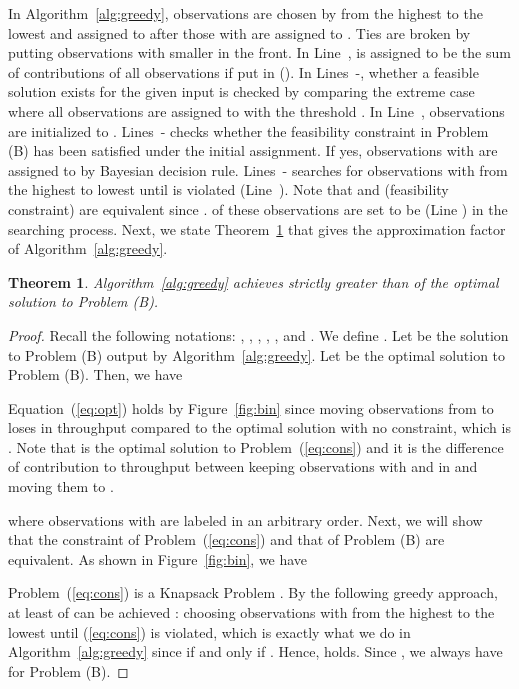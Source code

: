 \documentclass[conference]{IEEEtran}
\newtheorem{theorem}{Theorem}[section]
\begin{document}
In Algorithm~\ref{alg:greedy}, observations are chosen by  from the highest to the lowest and assigned to  after those with  are assigned to . Ties are broken by putting observations with smaller  in the front. In Line~,  is assigned to be the sum of contributions of all observations if put in  (). In Lines~-, whether a feasible solution exists for the given input is checked by comparing the extreme case where all observations are assigned to  with the threshold . In Line~, observations are initialized to . Lines~- checks whether the feasibility constraint in Problem (B) has been satisfied under the initial assignment. If yes, observations with  are assigned to  by Bayesian decision rule. Lines~- searches for observations with  from the highest  to lowest until  is violated (Line~). Note that  and  (feasibility constraint) are equivalent since .  of these observations are set to be  (Line ) in the searching process. Next, we state Theorem~\ref{thm:greedy} that gives the approximation factor of Algorithm~\ref{alg:greedy}.

\begin{theorem}
\label{thm:greedy}
Algorithm~\ref{alg:greedy} achieves strictly greater than  of the optimal solution to Problem (B).
\end{theorem}

\begin{proof}
Recall the following notations: , , , , , and . We define . Let  be the solution to Problem (B) output by Algorithm~\ref{alg:greedy}. Let  be the optimal solution to Problem (B). Then, we have 
\vspace{-0.5em}


Equation~(\ref{eq:opt}) holds by Figure~\ref{fig:bin} since moving observations from  to  loses  in throughput compared to the optimal solution with no constraint, which is . Note that  is the optimal solution to Problem~(\ref{eq:cons}) and it is the difference of contribution to throughput between keeping observations with  and  in  and moving them to . 



where observations with  are labeled in an arbitrary order. Next, we will show that the constraint of Problem~(\ref{eq:cons}) and that of Problem (B) are equivalent. As shown in Figure~\ref{fig:bin}, we have 
\vspace{-0.5em}



Problem~(\ref{eq:cons}) is a Knapsack Problem \cite{Vijay}. By the following greedy approach, at least  of  can be achieved \cite{Vijay}: choosing observations with  from the highest  to the lowest until (\ref{eq:cons}) is violated, which is exactly what we do in Algorithm~\ref{alg:greedy} since  if and only if . Hence,  holds. Since , we always have  for Problem (B). 
\end{proof}
\end{document}
